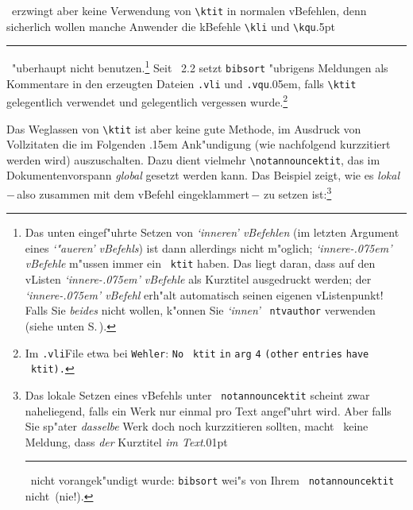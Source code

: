 \documentclass[12pt,a4paper]{article}
\newcommand{\pdfko}[1]{\kern #1pt
                              \rule[-0.4ex]{0.8pt}{0ex}\kern -0.8pt
                          \strut\ignorespaces}%
\newcommand{\pbs}{\string\ \unskip}
\newcommand{\bs}{\protect\pbs}
\begin{document}
\BibArts\ erzwingt aber keine Verwendung von \hspace{-.1em}\verb|\ktit| in normalen
v\fhy Befehlen, denn sicherlich wollen manche Anwender die k\hy Befehle
\hspace{-.1em}\verb|\kli| und \hspace{-.075em}\verb|\kqu|\pdfko{.5}\ 
"uberhaupt nicht benutzen.\footnote{Das
unten eingef"uhrte Setzen von \hspace{-.1em}\textit{`inneren' v\fhy Befehlen} (im letzten Argument
eines \hspace{-.1em}\textit{`"au\hyss eren' v\fhy Befehls}) ist dann allerdings nicht m"oglich; 
\hspace{-.1em}\textit{`innere\kern-.075em' v\fhy Befehle} m"ussen immer ein \texttt{\bs ktit} haben.
Das liegt daran, dass auf den v\fhy Listen \hspace{-.1em}\textit{`innere\kern-.075em' v\fhy Befehle} 
als Kurztitel ausgedruckt werden; der \hspace{-.1em}\textit{`innere\kern-.075em' v\fhy Befehl} 
erh"alt automatisch seinen eigenen v\fhy Listenpunkt! Falls Sie \textit{beides} nicht wollen, k"onnen
Sie \hspace{-.1em}\textit{`innen'} \texttt{\bs ntvauthor} verwenden (siehe unten S.\,\pageref{ntvauthor}).} 
Seit \BibArts~2.2 setzt \texttt{bibsort} "ubrigens Meldungen als Kommentare 
in den erzeugten Dateien \hspace{-.25em}\verb|.vli| und 
\hspace{-.2em}\verb|.vqu|\kern.05em, falls \hspace{-.075em}\verb|\ktit| 
gelegentlich verwendet und gelegentlich vergessen 
wurde.\footnote{Im \hspace{-.15em}\texttt{.vli}\hy File
etwa bei \hspace{.075em}\texttt{Wehler}: \hspace{.225em} 
\hspace{.1em}\texttt{No} \texttt{\bs ktit} \texttt{in} \texttt{arg} \texttt{4} 
\texttt{(other} \texttt{entries} \texttt{have} \texttt{\bs ktit).}} 

Das Weglassen von \hspace{-.05em}\verb|\ktit| ist aber keine gute Methode, im Ausdruck von
Vollzitaten die\hspace{.15em} {\footnotesize im Folgenden \hspace{-.075em}\fabra{...}}\kern.15em\hy 
Ank"undigung \hspace{.1em}(wie nachfolgend kurzzitiert werden wird) 
auszuschalten. Dazu dient vielmehr \verb|\notannouncektit|, das
im Dokumentenvorspann \textit{global} gesetzt werden kann. Das Beispiel zeigt, 
wie es \textit{lokal} $-$\,also zusammen mit dem v\fhy Befehl eingeklammert\,$-$ zu 
setzen ist:\footnote{Das lokale Setzen eines v\fhy Befehls unter 
\texttt{\bs notannouncektit} scheint zwar naheliegend, falls ein Werk nur 
einmal pro Text angef"uhrt wird. Aber falls Sie sp"ater \textit{dasselbe} Werk 
doch noch kurzzitieren sollten, macht \BibArts\ keine Meldung, dass
\textit{der} Kurztitel \textit{im Text}\pdfko{.01}\ 
nicht vorangek"undigt wurde: \hspace{.025em}\texttt{bibsort}
wei"s von Ihrem \texttt{\bs notannouncektit} nicht~(nie!).}
\end{document}
